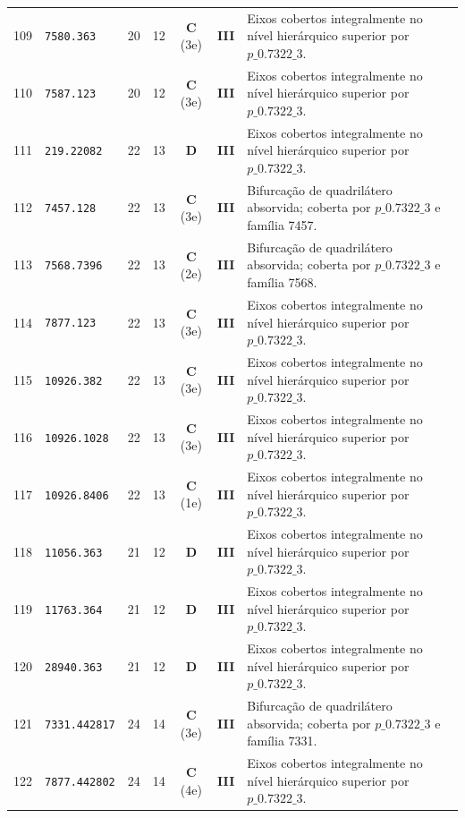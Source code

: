 \documentclass[11pt,a4paper]{article}
\begin{document}
\begin{small}
\begin{longtable}{r l c c c c p{8.8cm}}
109 & \texttt{7580.363} & 20 & 12 & \textbf{C} (3e) & \textbf{III} & Eixos cobertos integralmente no nível hierárquico superior por $p\_0.7322\_3$. \\
110 & \texttt{7587.123} & 20 & 12 & \textbf{C} (3e) & \textbf{III} & Eixos cobertos integralmente no nível hierárquico superior por $p\_0.7322\_3$. \\
111 & \texttt{219.22082} & 22 & 13 & \textbf{D} & \textbf{III} & Eixos cobertos integralmente no nível hierárquico superior por $p\_0.7322\_3$. \\
112 & \texttt{7457.128} & 22 & 13 & \textbf{C} (3e) & \textbf{III} & Bifurcação de quadrilátero absorvida; coberta por $p\_0.7322\_3$ e família 7457. \\
113 & \texttt{7568.7396} & 22 & 13 & \textbf{C} (2e) & \textbf{III} & Bifurcação de quadrilátero absorvida; coberta por $p\_0.7322\_3$ e família 7568. \\
114 & \texttt{7877.123} & 22 & 13 & \textbf{C} (3e) & \textbf{III} & Eixos cobertos integralmente no nível hierárquico superior por $p\_0.7322\_3$. \\
115 & \texttt{10926.382} & 22 & 13 & \textbf{C} (3e) & \textbf{III} & Eixos cobertos integralmente no nível hierárquico superior por $p\_0.7322\_3$. \\
116 & \texttt{10926.1028} & 22 & 13 & \textbf{C} (3e) & \textbf{III} & Eixos cobertos integralmente no nível hierárquico superior por $p\_0.7322\_3$. \\
117 & \texttt{10926.8406} & 22 & 13 & \textbf{C} (1e) & \textbf{III} & Eixos cobertos integralmente no nível hierárquico superior por $p\_0.7322\_3$. \\
118 & \texttt{11056.363} & 21 & 12 & \textbf{D} & \textbf{III} & Eixos cobertos integralmente no nível hierárquico superior por $p\_0.7322\_3$. \\
119 & \texttt{11763.364} & 21 & 12 & \textbf{D} & \textbf{III} & Eixos cobertos integralmente no nível hierárquico superior por $p\_0.7322\_3$. \\
120 & \texttt{28940.363} & 21 & 12 & \textbf{D} & \textbf{III} & Eixos cobertos integralmente no nível hierárquico superior por $p\_0.7322\_3$. \\
121 & \texttt{7331.442817} & 24 & 14 & \textbf{C} (3e) & \textbf{III} & Bifurcação de quadrilátero absorvida; coberta por $p\_0.7322\_3$ e família 7331. \\
122 & \texttt{7877.442802} & 24 & 14 & \textbf{C} (4e) & \textbf{III} & Eixos cobertos integralmente no nível hierárquico superior por $p\_0.7322\_3$. \\

\end{longtable}
\end{small}
\end{document}

